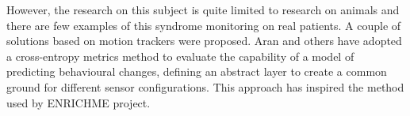 However, the research on this subject is quite limited to research on animals and there are few examples of this syndrome monitoring on real patients. 
A couple of solutions based on motion trackers were proposed. Aran and others have adopted a cross-entropy metrics method to evaluate the capability of
a model of predicting behavioural changes, defining an abstract layer to create a common ground for different sensor configurations. \cite{aran2016anomaly} This approach has
inspired the method used by ENRICHME project. 










